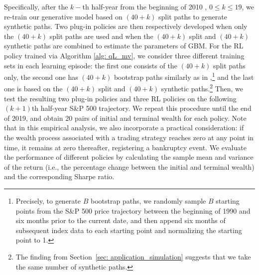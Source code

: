 \documentclass[11pt]{article}
\begin{document}
Specifically, after the $k-$th half-year from the beginning of 2010 , $0\le k\le 19$, we re-train our generative model based on $(40+k)$ split paths to generate synthetic paths.
Two plug-in policies are then respectively developed when only the $(40 + k)$ split paths are used and when the $(40 + k)$ split and $(40 + k)$ synthetic paths are combined to estimate the parameters of GBM. For the RL policy trained via Algorithm \ref{alg: qL_mv}, we consider three different training sets in each learning episode: the first one consists of the $(40 + k)$ split paths only, the second one has $(40 + k)$ bootstrap paths similarly as in \cite{jia2023q},\footnote{Precisely, to generate
$B$ bootstrap paths, we randomly sample $B$ starting points from the S\&P 500 price trajectory between the beginning of 1990 and six months prior to the current date, and then append six months of subsequent index data to each starting point and normalizing the starting point to 1.} and the last one is based on the $(40 + k)$ split and $(40 + k)$ synthetic paths.\footnote{The finding from Section~\ref{sec: application_simulation} suggests that we take the same number of synthetic paths.} Then, we test the resulting two plug-in policies and three RL policies on the following $(k + 1)$th half-year S\&P 500 trajectory. We repeat this procedure until the end of 2019, and obtain 20 pairs of initial and terminal wealth for each policy. Note that in this empirical analysis, we also incorporate a practical consideration: if the wealth process associated with a trading strategy reaches zero at any point in time, it remains at zero thereafter, registering a bankruptcy event.
We evaluate the performance of different policies by calculating the sample mean and variance of the return (i.e., the percentage change between the initial and terminal wealth) and the corresponding Sharpe ratio.
\end{document}
